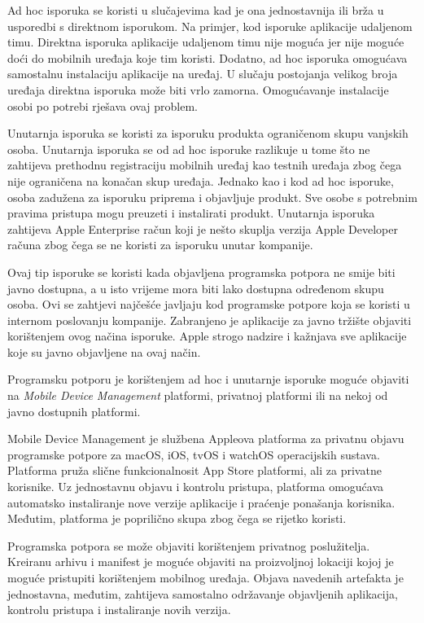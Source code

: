 \documentclass[times, utf8, diplomski, numeric]{fer}
\begin{document}
Ad hoc isporuka se koristi u slučajevima kad je ona jednostavnija ili brža u usporedbi s direktnom isporukom. Na primjer, kod isporuke aplikacije udaljenom timu. Direktna isporuka aplikacije udaljenom timu nije moguća jer nije moguće doći do mobilnih uređaja koje tim koristi. Dodatno, ad hoc isporuka omogućava samostalnu instalaciju aplikacije na uređaj. U slučaju postojanja velikog broja uređaja direktna isporuka može biti vrlo zamorna. Omogućavanje instalacije osobi po potrebi rješava ovaj problem.

Unutarnja isporuka se koristi za isporuku produkta ograničenom skupu vanjskih osoba. Unutarnja isporuka se od ad hoc isporuke razlikuje u tome što ne zahtijeva prethodnu registraciju mobilnih uređaj kao testnih uređaja zbog čega nije ograničena na konačan skup uređaja. Jednako kao i kod ad hoc isporuke, osoba zadužena za isporuku priprema i objavljuje produkt. Sve osobe s potrebnim pravima pristupa mogu preuzeti i instalirati produkt. Unutarnja isporuka zahtijeva Apple Enterprise račun koji je nešto skuplja verzija Apple Developer računa zbog čega se ne koristi za isporuku unutar kompanije.

Ovaj tip isporuke se koristi kada objavljena programska potpora ne smije biti javno dostupna, a u isto vrijeme mora biti lako dostupna određenom skupu osoba. Ovi se zahtjevi najčešće javljaju kod programske potpore koja se koristi u internom poslovanju kompanije. Zabranjeno je aplikacije za javno tržište objaviti korištenjem ovog načina isporuke. Apple strogo nadzire i kažnjava sve aplikacije koje su javno objavljene na ovaj način.

Programsku potporu je korištenjem ad hoc i unutarnje isporuke moguće objaviti na \textit{Mobile Device Management} platformi, privatnoj platformi ili na nekoj od javno dostupnih platformi.

Mobile Device Management je službena Appleova platforma za privatnu objavu programske potpore za macOS, iOS, tvOS i watchOS operacijskih sustava. Platforma pruža slične funkcionalnosit App Store platformi, ali za privatne korisnike. Uz jednostavnu objavu i kontrolu pristupa, platforma omogućava automatsko instaliranje nove verzije aplikacije i praćenje ponašanja korisnika. Međutim, platforma je poprilično skupa zbog čega se rijetko koristi.

Programska potpora se može objaviti korištenjem privatnog poslužitelja. Kreiranu arhivu i manifest je moguće objaviti na proizvoljnoj lokaciji kojoj je moguće pristupiti korištenjem mobilnog uređaja. Objava navedenih artefakta je jednostavna, međutim, zahtijeva samostalno održavanje objavljenih aplikacija, kontrolu pristupa i instaliranje novih verzija.
\end{document}
